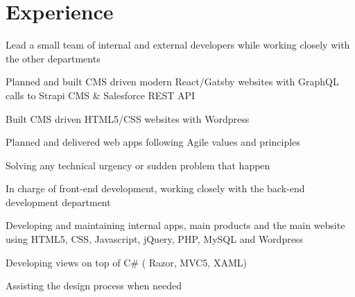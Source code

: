 \documentclass[letterpaper]{algo-resume}
\begin{document}
\hfill
%
%
%
\begin{minipage}[t]{0.66\textwidth} 



\section{Experience}


\vspace{\topsep} 
\begin{tightitemize}
\item Lead a small team of internal and external developers while working closely with the other departments 
\item Planned and built CMS driven modern React/Gatsby websites with GraphQL calls to Strapi CMS \& Salesforce REST API
\item Built CMS driven HTML5/CSS websites with Wordpress
\item Planned and delivered web apps following Agile values and principles
\item Solving any technical urgency or sudden problem that happen
\end{tightitemize}

\sectionspace 



\begin{tightitemize}
\item In charge of front-end development, working closely with the back-end development department
\item Developing and maintaining internal apps, main products and the main website using HTML5, CSS, Javascript, jQuery, PHP, MySQL and Wordpress
\item Developing views on top of C\# ( Razor, MVC5, XAML)
\item Assisting the design process when needed

\end{tightitemize}

\sectionspace 




\end{minipage}
\end{document}
